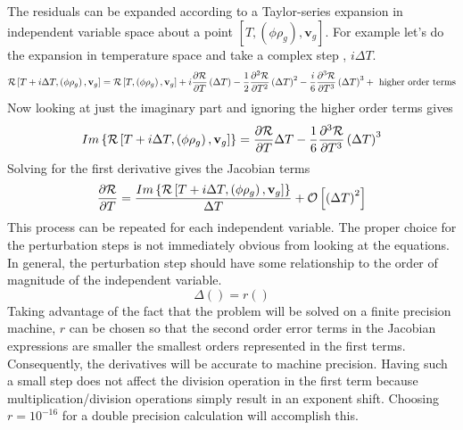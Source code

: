 The residuals can be expanded according to a Taylor-series expansion in independent variable space about a point $\left[T,\left(\phi \rho_{g} \right),\mathbf{v}_g\right]$. For example let's do the expansion in temperature space and take a complex step , $i\Delta T$.
\begin{multline}
  \mathcal{R}\left[T+i\Delta T,\left(\phi \rho_{g} \right),\mathbf{v}_g\right] = \mathcal{R}\left[T,\left(\phi \rho_{g} \right),\mathbf{v}_g\right] + i{\frac{\partial{\mathcal{R}}}{\partial{T}}}\left(\Delta T\right) - \frac{1}{2} {\frac{\partial{^{2}\mathcal{R}}}{\partial{T^{2}}}}\left(\Delta T\right)^{2}  - \frac{i}{6} {\frac{\partial{^{3}\mathcal{R}}}{\partial{T^{3}}}}\left(\Delta T\right)^{3} + \text{ higher order terms}
\label{complex_step}
\end{multline}
Now looking at just the imaginary part and ignoring the higher order terms gives
\begin{equation}
  Im\left\{ \mathcal{R}\left[T+i\Delta T,\left(\phi \rho_{g} \right),\mathbf{v}_g\right] \right\} = {\frac{\partial{\mathcal{R}}}{\partial{T}}} \Delta T - \frac{1}{6} {\frac{\partial{^{3}\mathcal{R}}}{\partial{T^{3}}}}\left(\Delta T\right)^{3} 
\end{equation}
Solving for the first derivative gives the Jacobian terms
\begin{equation}
  {\frac{\partial{\mathcal{R}}}{\partial{T}}} = \frac{Im\left\{ \mathcal{R}\left[T+i\Delta T,\left(\phi \rho_{g} \right),\mathbf{v}_g \right] \right\}}{\Delta T} + \mathcal{O}\left[\left(\Delta T \right)^{2} \right]
\end{equation}
This process can be repeated for each independent variable. The proper choice for the perturbation steps is not immediately obvious from looking at the equations.  In general, the perturbation step should have some relationship to the order of magnitude of the independent variable.
\begin{equation}
  \Delta \left(\right) = r \left(\right)
\end{equation}
Taking advantage of the fact that the problem will be solved on a finite precision machine, $r$ can be chosen so that the second order error terms in the Jacobian expressions are smaller the smallest orders represented in the first terms.  Consequently, the derivatives will be accurate to machine precision.  Having such a small step does not affect the division operation in the first term because multiplication/division operations simply result in an exponent shift.  Choosing $r = 10^{-16}$ for a double precision calculation will accomplish this.

